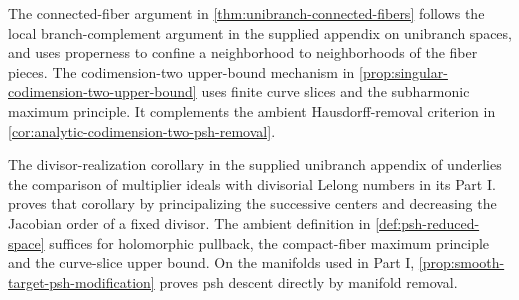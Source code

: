 The connected-fiber argument in \cref{thm:unibranch-connected-fibers} follows the local branch-complement argument in the supplied appendix on unibranch spaces, and uses properness to confine a neighborhood to neighborhoods of the fiber pieces. The codimension-two upper-bound mechanism in \cref{prop:singular-codimension-two-upper-bound} uses finite curve slices and the subharmonic maximum principle. It complements the ambient Hausdorff-removal criterion in \cref{cor:analytic-codimension-two-psh-removal}.

The divisor-realization corollary in the supplied unibranch appendix of \cite{XiaSampleBook} underlies the comparison of multiplier ideals with divisorial Lelong numbers in its Part I.  proves that corollary by principalizing the successive centers and decreasing the Jacobian order of a fixed divisor. The ambient definition in \cref{def:psh-reduced-space} suffices for holomorphic pullback, the compact-fiber maximum principle and the curve-slice upper bound. On the manifolds used in Part I, \cref{prop:smooth-target-psh-modification} proves psh descent directly by manifold removal.

